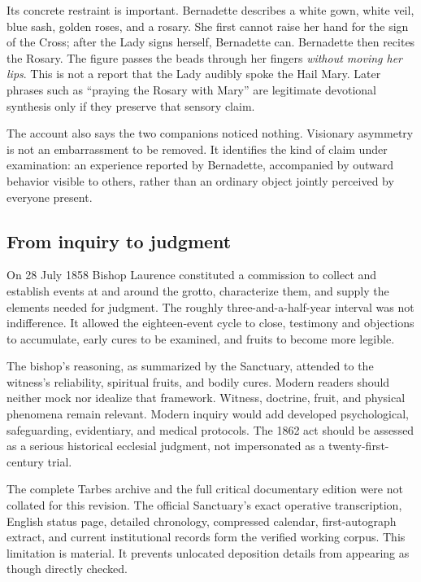 Its concrete restraint is important. Bernadette describes a white gown, white veil, blue sash, golden roses, and a rosary. She first cannot raise her hand for the sign of the Cross; after the Lady signs herself, Bernadette can. Bernadette then recites the Rosary. The figure passes the beads through her fingers \emph{without moving her lips}. This is not a report that the Lady audibly spoke the Hail Mary. Later phrases such as “praying the Rosary with Mary” are legitimate devotional synthesis only if they preserve that sensory claim.

The account also says the two companions noticed nothing. Visionary asymmetry is not an embarrassment to be removed. It identifies the kind of claim under examination: an experience reported by Bernadette, accompanied by outward behavior visible to others, rather than an ordinary object jointly perceived by everyone present.

\subsection{From inquiry to judgment}

On 28 July 1858 Bishop Laurence constituted a commission to collect and establish events at and around the grotto, characterize them, and supply the elements needed for judgment. The roughly three-and-a-half-year interval was not indifference. It allowed the eighteen-event cycle to close, testimony and objections to accumulate, early cures to be examined, and fruits to become more legible.

The bishop's reasoning, as summarized by the Sanctuary, attended to the witness's reliability, spiritual fruits, and bodily cures. Modern readers should neither mock nor idealize that framework. Witness, doctrine, fruit, and physical phenomena remain relevant. Modern inquiry would add developed psychological, safeguarding, evidentiary, and medical protocols. The 1862 act should be assessed as a serious historical ecclesial judgment, not impersonated as a twenty-first-century trial.

The complete Tarbes archive and the full critical documentary edition were not collated for this revision. The official Sanctuary's exact operative transcription, English status page, detailed chronology, compressed calendar, first-autograph extract, and current institutional records form the verified working corpus. This limitation is material. It prevents unlocated deposition details from appearing as though directly checked.

